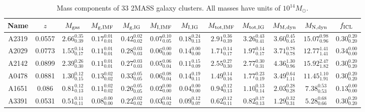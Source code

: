      \begin{table}
     \caption{Mass components of 33 2MASS galaxy clusters. All masses have units of $10^{14}M_{\odot}$.}             %
     \label{2MASS_table}      %
     \centering                          %
     \begin{ruledtabular}
     \begin{tabular}{c c c c c c c c c c c c}        %
     Name &  $z$ &  $M_{\rm gas}$  &  $M_{\rm g,IMF}$  &  $M_{\rm g,IG}$   & $M_{\rm I,IMF}$  & $M_{\rm I,IG}$ & $M_{\rm tot,IMF}$  & $M_{\rm tot,IG}$   & $M_{\rm M,dyn}$  & $M_{\rm N,dyn}$ &  $f_{\rm ICL}$\\    %
     \hline                        %
     A2319 & 0.0557 & $2.66^{0.35}_{0.39}$ & $0.17^{0.01}_{0.01}$ & $0.42^{0.02}_{0.02}$ & $0.07^{0.10}_{0.05}$ & $0.18^{0.24}_{0.13}$ & $2.91^{0.36}_{0.39}$ & $3.26^{0.43}_{0.41}$ & $3.60^{0.45}_{0.45}$ & $15.07^{0.98}_{0.96}$ & $0.30^{0.20}_{0.20}$ \\
     A2029 & 0.0773 & $1.55^{0.14}_{0.17}$ & $0.11^{0.01}_{0.01}$ & $0.28^{0.03}_{0.03}$ & $0.06^{0.00}_{0.00}$ & $0.14^{0.00}_{0.00}$ & $1.71^{0.14}_{0.17}$ & $1.97^{0.14}_{0.17}$ & $3.71^{0.78}_{0.78}$ & $12.77^{1.41}_{1.41}$ & $0.34^{0.00}_{0.00}$ \\
     A2142 & 0.0899 & $2.39^{0.26}_{0.30}$ & $0.11^{0.01}_{0.01}$ & $0.27^{0.03}_{0.03}$ & $0.05^{0.06}_{0.04}$ & $0.11^{0.15}_{0.09}$ & $2.55^{0.27}_{0.30}$ & $2.77^{0.30}_{0.31}$ & $4.36^{1.30}_{0.96}$ & $15.92^{2.47}_{1.82}$ & $0.30^{0.20}_{0.20}$ \\
     A0478 & 0.0881 & $1.30^{0.12}_{0.15}$ & $0.13^{0.02}_{0.02}$ & $0.33^{0.05}_{0.05}$ & $0.06^{0.08}_{0.04}$ & $0.14^{0.19}_{0.11}$ & $1.49^{0.14}_{0.16}$ & $1.77^{0.23}_{0.19}$ & $3.49^{0.64}_{1.11}$ & $11.45^{1.10}_{1.91}$ & $0.30^{0.20}_{0.20}$ \\
     A1651 & 0.086 & $0.81^{0.12}_{0.13}$ & $0.11^{0.02}_{0.02}$ & $0.26^{0.05}_{0.05}$ & $0.02^{0.00}_{0.00}$ & $0.04^{0.00}_{0.00}$ & $0.94^{0.12}_{0.13}$ & $1.10^{0.13}_{0.14}$ & $2.03^{0.28}_{0.28}$ & $7.38^{0.53}_{0.53}$ & $0.13^{0.00}_{0.00}$ \\
     A3391 & 0.0531 & $0.51^{0.11}_{0.11}$ & $0.08^{0.00}_{0.00}$ & $0.22^{0.02}_{0.02}$ & $0.03^{0.04}_{0.02}$ & $0.09^{0.12}_{0.07}$ & $0.62^{0.12}_{0.11}$ & $0.82^{0.17}_{0.13}$ & $1.29^{0.32}_{0.31}$ & $5.28^{0.68}_{0.66}$ & $0.30^{0.20}_{0.20}$ \\

\end{tabular}
\end{ruledtabular}
\end{table}
